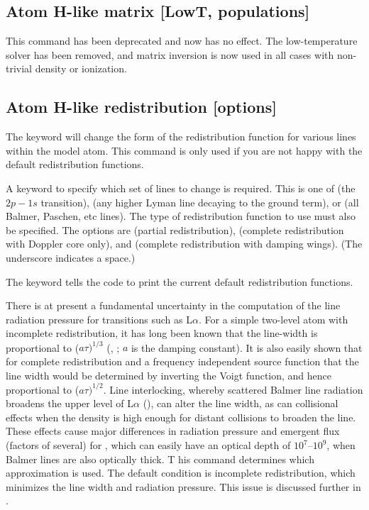 \subsection{Atom H-like matrix [LowT, populations]}

This command has been deprecated and now has no effect.  The low-temperature solver has been removed,
and matrix inversion is now used in all cases with non-trivial density or ionization.

\subsection{Atom H-like redistribution [options]}

The keyword  will change the form of the redistribution
function for various lines within the model atom.
This command is only
used if you are not happy with the default redistribution functions.

A keyword to specify which set of lines to change is required.
This is one of  (the $2p - 1s$ transition),  (any higher Lyman line
decaying to the ground term), or 
(all Balmer, Paschen, etc lines).
The type of redistribution function to use must also be specified.
The options are  (partial redistribution),  (complete redistribution
with Doppler core only), and 
(complete redistribution with damping wings).
(The underscore indicates a space.)

The keyword  tells the code to print the current default
redistribution functions.

There is at present a fundamental uncertainty in the computation of the
line radiation pressure for transitions such as L$\alpha $.
For a simple two-level
atom with incomplete redistribution, it has long been known that the
line-width is proportional to ($a\tau)^{1/3}$
(\citealp{Adams1972}, \citealp{Harrington1973}; $a$ is
the damping constant).  It is also easily shown that for complete
redistribution and a frequency independent source function that the line
width would be determined by inverting the Voigt function, and hence
proportional to ($a\tau)^{1/2}$.
Line interlocking, whereby scattered Balmer line
radiation broadens the upper level of L$\alpha$
(\citealp{Hubbard1985}), can
alter the line width, as can collisional effects when the density is high
enough for distant collisions to broaden the line.
These effects cause
major differences in radiation pressure and emergent flux (factors of
several) for \la, which can easily have an optical depth of
$10^7$--$10^9$, when
Balmer lines are also optically thick.  T
his command determines which
approximation is used.
The default condition is incomplete redistribution,
which minimizes the line width and radiation pressure.  This issue is
discussed further in \citet{Elitzur1986}.

